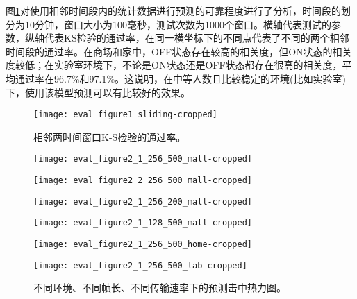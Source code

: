 图\ref{fig:kstest}对使用相邻时间段内的统计数据进行预测的可靠程度进行了分析，时间段的划分为10分钟，窗口大小为100毫秒，测试次数为1000个窗口。横轴代表测试的参数，纵轴代表KS检验的通过率，在同一横坐标下的不同点代表了不同的两个相邻时间段的通过率。在商场和家中，OFF状态存在较高的相关度，但ON状态的相关度较低；在实验室环境下，不论是ON状态还是OFF状态都存在很高的相关度，平均通过率在96.7\%和97.1\%。这说明，在中等人数且比较稳定的环境(比如实验室)下，使用该模型预测可以有比较好的效果。
\begin{figure}[t]
	\centering
	\texttt{[image: eval\_figure1\_sliding-cropped]}
	\caption{相邻两时间窗口K-S检验的通过率。}
	\label{fig:kstest}
\end{figure}
\begin{figure}[t]
	\begin{minipage}[b]{.32\linewidth}
		\texttt{[image: eval\_figure2\_1\_256\_500\_mall-cropped]}
		\label{fig:hitmap_256_500_0.6_mall}
	\end{minipage}
	\hfill
	\begin{minipage}[b]{.32\linewidth}
		\texttt{[image: eval\_figure2\_2\_256\_500\_mall-cropped]}
		\label{fig:hitmap_256_500_0.5_mall}
	\end{minipage}
	\hfill
	\begin{minipage}[b]{.32\linewidth}
		\texttt{[image: eval\_figure2\_1\_256\_200\_mall-cropped]}
		\label{fig:hitmap_256_200_0.6_mall}
	\end{minipage}
	
	\begin{minipage}[b]{.32\linewidth}
		\texttt{[image: eval\_figure2\_1\_128\_500\_mall-cropped]}
		\label{fig:hitmap_128_500_0.6_mall}
	\end{minipage}
	\hfill
	\begin{minipage}[b]{.32\linewidth}
		\texttt{[image: eval\_figure2\_1\_256\_500\_home-cropped]}
		\label{fig:hitmap_256_500_0.6_home}
	\end{minipage}
	\hfill
	\begin{minipage}[b]{.32\linewidth}
		\texttt{[image: eval\_figure2\_1\_256\_500\_lab-cropped]}
		\label{fig:hitmap_256_500_0.6_lab}
	\end{minipage}
	\caption{不同环境、不同帧长、不同传输速率下的预测击中热力图。}\label{fig:hitmap}
\end{figure}


